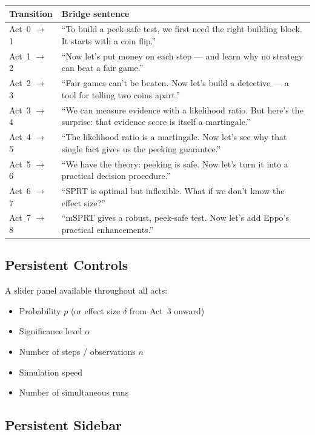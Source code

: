 \documentclass[12pt, a4paper]{article}
\begin{document}
\begin{center}
\renewcommand{\arraystretch}{1.3}
\begin{tabular}{@{} l p{9cm} @{}}
\toprule
\textbf{Transition} & \textbf{Bridge sentence} \\
\midrule
Act~0 $\to$ 1 & ``To build a peek-safe test, we first need the right
  building block.  It starts with a coin flip.'' \\
Act~1 $\to$ 2 & ``Now let's put money on each step --- and learn why no
  strategy can beat a fair game.'' \\
Act~2 $\to$ 3 & ``Fair games can't be beaten.  Now let's build a detective
  --- a tool for telling two coins apart.'' \\
Act~3 $\to$ 4 & ``We can measure evidence with a likelihood ratio.  But
  here's the surprise: that evidence score is itself a martingale.'' \\
Act~4 $\to$ 5 & ``The likelihood ratio is a martingale.  Now let's see why
  that single fact gives us the peeking guarantee.'' \\
Act~5 $\to$ 6 & ``We have the theory: peeking is safe.  Now let's turn it
  into a practical decision procedure.'' \\
Act~6 $\to$ 7 & ``SPRT is optimal but inflexible.  What if we don't know the
  effect size?'' \\
Act~7 $\to$ 8 & ``mSPRT gives a robust, peek-safe test.  Now let's add
  Eppo's practical enhancements.'' \\
\bottomrule
\end{tabular}
\end{center}

\subsection{Persistent Controls}

A slider panel available throughout all acts:
\begin{itemize}[nosep]
  \item Probability $p$ (or effect size $\delta$ from Act~3 onward)
  \item Significance level $\alpha$
  \item Number of steps / observations $n$
  \item Simulation speed
  \item Number of simultaneous runs
\end{itemize}

\subsection{Persistent Sidebar}
\end{document}
